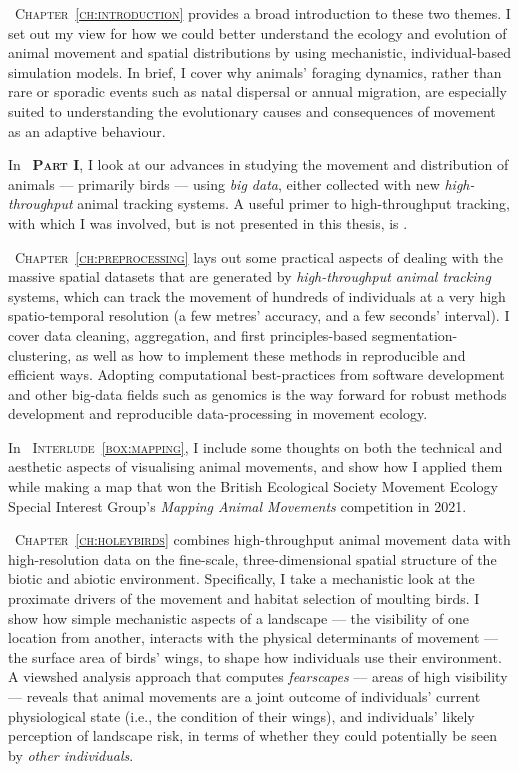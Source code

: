 {\scshape~Chapter~\ref{ch:introduction}} provides a broad introduction to these two themes.
I set out my view for how we could better understand the ecology and evolution of animal movement and spatial distributions by using mechanistic, individual-based simulation models.
In brief, I cover why animals' foraging dynamics, rather than rare or sporadic events such as natal dispersal or annual migration, are especially suited to understanding the evolutionary causes and consequences of movement as an adaptive behaviour.


\medskip

\noindent In {\scshape~\textbf{Part I}}, I look at our advances in studying the movement and distribution of animals --- primarily birds --- using \textit{big data}, either collected with new \textit{high-throughput} animal tracking systems.
A useful primer to high-throughput tracking, with which I was involved, but is not presented in this thesis, is \textcite{nathan2022}.

\medskip

{\scshape~Chapter~\ref{ch:preprocessing}} lays out some practical aspects of dealing with the massive spatial datasets that are generated by \textit{high-throughput animal tracking} systems, which can track the movement of hundreds of individuals at a very high spatio-temporal resolution (a few metres' accuracy, and a few seconds' interval).
I cover data cleaning, aggregation, and first principles-based segmentation-clustering, as well as how to implement these methods in reproducible and efficient ways.
Adopting computational best-practices from software development and other big-data fields such as genomics is the way forward for robust methods development and reproducible data-processing in movement ecology.

\medskip

\noindent In {\scshape~Interlude~\ref{box:mapping}}, I include some thoughts on both the technical and aesthetic aspects of visualising animal movements, and show how I applied them while making a map that won the British Ecological Society Movement Ecology Special Interest Group's \emph{Mapping Animal Movements} competition in 2021.

\medskip

{\scshape~Chapter~\ref{ch:holeybirds}} combines high-throughput animal movement data with high-resolution data on the fine-scale, three-dimensional spatial structure of the biotic and abiotic environment.
Specifically, I take a mechanistic look at the proximate drivers of the movement and habitat selection of moulting birds.
I show how simple mechanistic aspects of a landscape --- the visibility of one location from another, interacts with the physical determinants of movement --- the surface area of birds' wings, to shape how individuals use their environment.
A viewshed analysis approach that computes \textit{fearscapes} --- areas of high visibility --- reveals that animal movements are a joint outcome of individuals' current physiological state (i.e., the condition of their wings), and individuals' likely perception of landscape risk, in terms of whether they could potentially be seen by \textit{other individuals}.

